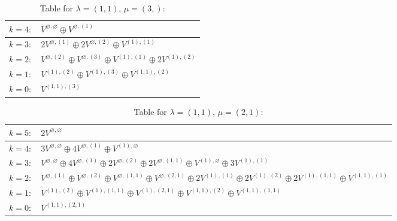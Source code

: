 \documentclass[a4paper,12pt]{article}
\begin{document}
\renewcommand{\arraystretch}{1.6} 
\begin{table}[H]
\centering
\caption{Table for $\lambda = (1, 1)$, $\mu = (3,)$:}
\begin{tabular}{|>{\centering\arraybackslash}p{15cm}|}
\hline
 $k = 4: \quad V^{\varnothing, \varnothing} \oplus V^{\varnothing, (1)} $ \\ \hline
 $k = 3: \quad 2 V^{\varnothing, (1)} \oplus 2 V^{\varnothing, (2)} \oplus V^{(1), (1)} $ \\ \hline
 $k = 2: \quad V^{\varnothing, (2)} \oplus V^{\varnothing, (3)} \oplus V^{(1), (1)} \oplus 2 V^{(1), (2)} $ \\ \hline
 $k = 1: \quad V^{(1), (2)} \oplus V^{(1), (3)} \oplus V^{(1, 1), (2)} $ \\ \hline
 $k = 0: \quad V^{(1, 1), (3)} $ \\ \hline
\end{tabular}
\end{table}

\renewcommand{\arraystretch}{1.6} 
\begin{table}[H]
\centering
\caption{Table for $\lambda = (1, 1)$, $\mu = (2, 1)$:}
\begin{tabular}{|>{\centering\arraybackslash}p{15cm}|}
\hline
 $k = 5: \quad 2 V^{\varnothing, \varnothing} $ \\ \hline
 $k = 4: \quad 3 V^{\varnothing, \varnothing} \oplus 4 V^{\varnothing, (1)} \oplus V^{(1), \varnothing} $ \\ \hline
 $k = 3: \quad V^{\varnothing, \varnothing} \oplus 4 V^{\varnothing, (1)} \oplus 2 V^{\varnothing, (2)} \oplus 2 V^{\varnothing, (1, 1)} \oplus V^{(1), \varnothing} \oplus 3 V^{(1), (1)} $ \\ \hline
 $k = 2: \quad V^{\varnothing, (1)} \oplus V^{\varnothing, (2)} \oplus V^{\varnothing, (1, 1)} \oplus V^{\varnothing, (2, 1)} \oplus 2 V^{(1), (1)} \oplus 2 V^{(1), (2)} \oplus 2 V^{(1), (1, 1)} \oplus V^{(1, 1), (1)} $ \\ \hline
 $k = 1: \quad V^{(1), (2)} \oplus V^{(1), (1, 1)} \oplus V^{(1), (2, 1)} \oplus V^{(1, 1), (2)} \oplus V^{(1, 1), (1, 1)} $ \\ \hline
 $k = 0: \quad V^{(1, 1), (2, 1)} $ \\ \hline
\end{tabular}
\end{table}
\end{document}
